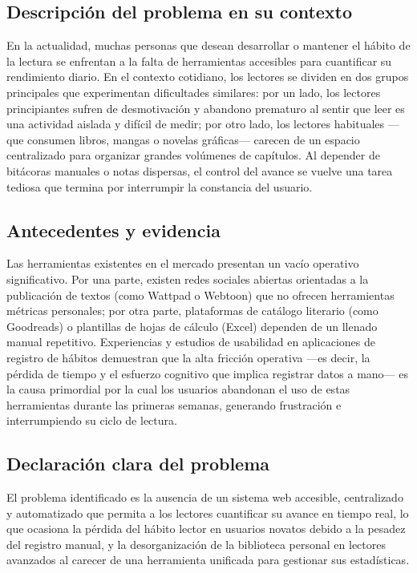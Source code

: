\documentclass[12pt, atypical, journal]{article}
\begin{document}
\subsection{Descripción del problema en su contexto}
En la actualidad, muchas personas que desean desarrollar o mantener el hábito de la lectura se enfrentan a la falta de herramientas accesibles para cuantificar su rendimiento diario. En el contexto cotidiano, los lectores se dividen en dos grupos principales que experimentan dificultades similares: por un lado, los lectores principiantes sufren de desmotivación y abandono prematuro al sentir que leer es una actividad aislada y difícil de medir; por otro lado, los lectores habituales —que consumen libros, mangas o novelas gráficas— carecen de un espacio centralizado para organizar grandes volúmenes de capítulos. Al depender de bitácoras manuales o notas dispersas, el control del avance se vuelve una tarea tediosa que termina por interrumpir la constancia del usuario.

\subsection{Antecedentes y evidencia}
Las herramientas existentes en el mercado presentan un vacío operativo significativo. Por una parte, existen redes sociales abiertas orientadas a la publicación de textos (como Wattpad o Webtoon) que no ofrecen herramientas métricas personales; por otra parte, plataformas de catálogo literario (como Goodreads) o plantillas de hojas de cálculo (Excel) dependen de un llenado manual repetitivo. Experiencias y estudios de usabilidad en aplicaciones de registro de hábitos demuestran que la alta fricción operativa —es decir, la pérdida de tiempo y el esfuerzo cognitivo que implica registrar datos a mano— es la causa primordial por la cual los usuarios abandonan el uso de estas herramientas durante las primeras semanas, generando frustración e interrumpiendo su ciclo de lectura.

\subsection{Declaración clara del problema}
El problema identificado es la ausencia de un sistema web accesible, centralizado y automatizado que permita a los lectores cuantificar su avance en tiempo real, lo que ocasiona la pérdida del hábito lector en usuarios novatos debido a la pesadez del registro manual, y la desorganización de la biblioteca personal en lectores avanzados al carecer de una herramienta unificada para gestionar sus estadísticas.
\end{document}
